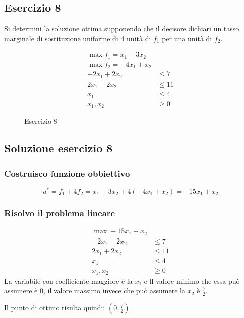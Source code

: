 \documentclass[\main/main.tex]{subfiles}
\begin{document}
\subsection{Esercizio 8}
Si determini la soluzione ottima supponendo che il decisore dichiari un tasso marginale di sostituzione uniforme di 4 unità di $f_1$ per una unità di $f_2$.

\begin{figure}
  \begin{align*}
    \max f_1 = x_1 -3x_2   \\
    \max f_2 = -4x_1 + x_2 \\
    -2x_1 + 2x_2 & \leq 7  \\
    2x_1 + 2x_2  & \leq 11 \\
    x_1          & \leq 4  \\
    x_1, x_2     & \geq 0
  \end{align*}
  \caption{Esercizio 8}
\end{figure}

\subsection{Soluzione esercizio 8}
\subsubsection*{Costruisco funzione obbiettivo}

\[
  u^* = f_1 + 4f_2 = x_1 -3x_2 + 4(-4x_1 + x_2) = -15x_1 + x_2
\]

\subsubsection*{Risolvo il problema lineare}
\begin{align*}
  \max -15x_1 + x_2      \\
  -2x_1 + 2x_2 & \leq 7  \\
  2x_1 + 2x_2  & \leq 11 \\
  x_1          & \leq 4  \\
  x_1, x_2     & \geq 0
\end{align*}
La variabile con coefficiente maggiore è la $x_1$ e ll valore minimo che essa può assumere è $0$, il valore massimo invece che può assumere la $x_2$ è $\frac{7}{2}$.

Il punto di ottimo risulta quindi: $(0, \frac{7}{2})$.
\end{document}
